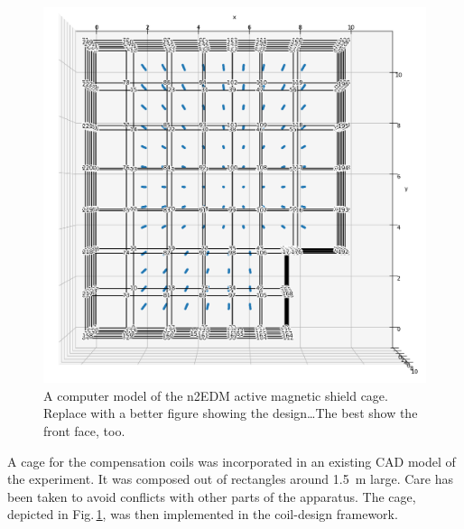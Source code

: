 \begin{figure}
  \centering
  \includegraphics[width=\linewidth]{gfx/prototype/n2EDM_system_top.png}
  \caption{A computer model of the n2EDM active magnetic shield cage. Replace with a better figure showing the design\ldots The best show the front face, too.}\label{fig:n2EDM_design_top}
\end{figure}

A cage for the compensation coils was incorporated in an existing CAD model of the experiment.
It was composed out of rectangles around \SI{1.5}{\metre} large.
Care has been taken to avoid conflicts with other parts of the apparatus.
The cage, depicted in Fig.\,\ref{fig:n2EDM_design_top}, was then implemented in the coil-design framework.

